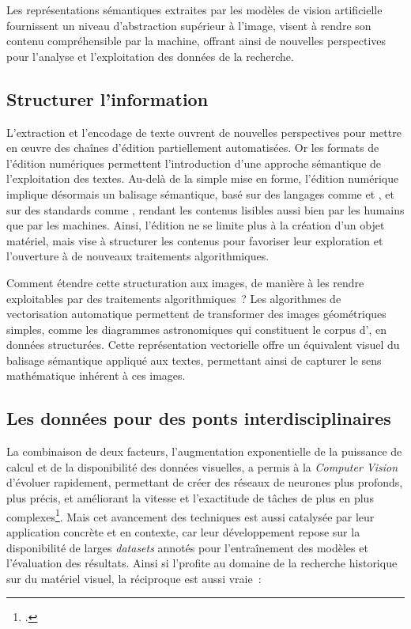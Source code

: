 Les représentations sémantiques extraites par les modèles de vision artificielle fournissent un niveau d'abstraction supérieur à l'image, visent à rendre son contenu compréhensible par la machine, offrant ainsi de nouvelles perspectives pour l'analyse et l'exploitation des données de la recherche.

\subsection{Structurer l'information}

L'extraction et l'encodage de texte ouvrent de nouvelles perspectives pour mettre en œuvre des chaînes d'édition partiellement automatisées. Or les formats de l'édition numériques permettent l'introduction d'une approche sémantique de l'exploitation des textes. Au-delà de la simple mise en forme, l'édition numérique implique désormais un balisage sémantique, basé sur des langages comme \xml et \html, et sur des standards comme \tei, rendant les contenus lisibles aussi bien par les humains que par les machines. Ainsi, l'édition ne se limite plus à la création d'un objet matériel, mais vise à structurer les contenus pour favoriser leur exploration et l'ouverture à de nouveaux traitements algorithmiques.

Comment étendre cette structuration aux images, de manière à les rendre exploitables par des traitements algorithmiques~? Les algorithmes de vectorisation automatique permettent de transformer des images géométriques simples, comme les diagrammes astronomiques qui constituent le corpus d'\eida, en données structurées. Cette représentation vectorielle offre un équivalent visuel du balisage sémantique appliqué aux textes, permettant ainsi de capturer le sens mathématique inhérent à ces images.

\subsection{Les données pour des ponts interdisciplinaires}

La combinaison de deux facteurs, l'augmentation exponentielle de la puissance de calcul et de la disponibilité des données visuelles, a permis à la \textit{Computer Vision} d'évoluer rapidement, permettant de créer des réseaux de neurones plus profonds, plus précis, et améliorant la vitesse et l'exactitude de tâches de plus en plus complexes\footcite{klinke_big_2016}. Mais cet avancement des techniques est aussi catalysée par leur application concrète et en contexte, car leur développement repose sur la disponibilité de larges \textit{datasets} annotés pour l'entraînement des modèles et l'évaluation des résultats. Ainsi si l'\ia profite au domaine de la recherche historique sur du matériel visuel, la réciproque est aussi vraie~: 


